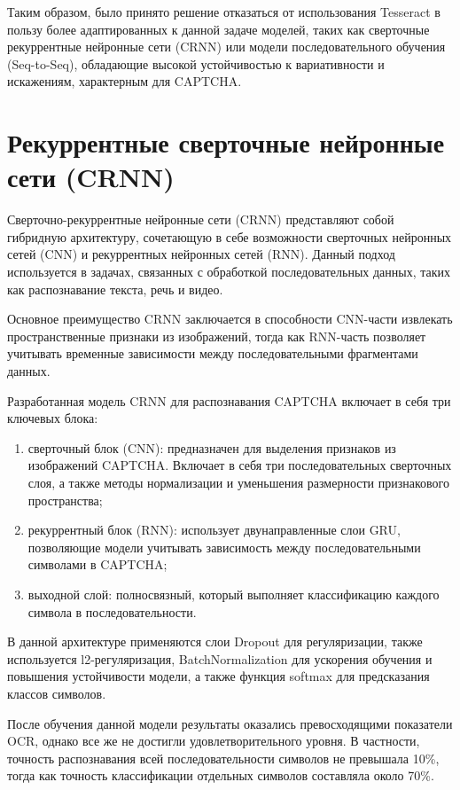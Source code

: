 \documentclass{altsu-report}
\begin{document}
Таким образом, было принято решение отказаться от использования Tesseract в пользу более адаптированных к данной задаче моделей, таких как сверточные рекуррентные нейронные сети (CRNN) или модели последовательного обучения (Seq-to-Seq), обладающие высокой устойчивостью к вариативности и искажениям, характерным для CAPTCHA.

\section*{Рекуррентные сверточные нейронные сети (CRNN)}

Сверточно-рекуррентные нейронные сети (CRNN) представляют собой гибридную архитектуру, сочетающую в себе возможности сверточных нейронных сетей (CNN) и рекуррентных нейронных сетей (RNN). Данный подход используется в задачах, связанных с обработкой последовательных данных, таких как распознавание текста, речь и видео.

Основное преимущество CRNN заключается в способности CNN-части извлекать пространственные признаки из изображений, тогда как RNN-часть позволяет учитывать временные зависимости между последовательными фрагментами данных.

Разработанная модель CRNN для распознавания CAPTCHA включает в себя три ключевых блока:
\begin{enumerate}
    \item сверточный блок (CNN): предназначен для выделения признаков из изображений CAPTCHA. Включает в себя три последовательных сверточных слоя, а также методы нормализации и уменьшения размерности признакового пространства;
    \item рекуррентный блок (RNN): использует двунаправленные слои GRU, позволяющие модели учитывать зависимость между последовательными символами в CAPTCHA;
    \item выходной слой: полносвязный, который выполняет классификацию каждого символа в последовательности.
\end{enumerate}

В данной архитектуре применяются слои Dropout для регуляризации, также используется l2-регуляризация, BatchNormalization для ускорения обучения и повышения устойчивости модели, а также функция softmax для предсказания классов символов.

После обучения данной модели результаты оказались превосходящими показатели OCR, однако все же не достигли удовлетворительного уровня. В частности, точность распознавания всей последовательности символов не превышала 10\%, тогда как точность классификации отдельных символов составляла около 70\%.
\end{document}
